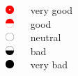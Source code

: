 \documentclass[ 10pt]{beamer}
\begin{document}
{\begin{columns}[]
\begin{column}[t]{0.4\textwidth}
{\includegraphics[height=0.13in]{CR5.pdf} $\quad$ very good\\
\vspace{1mm}
\includegraphics[height=0.13in]{CR4.pdf} $\quad$ good\\
\vspace{1mm}
\includegraphics[height=0.13in]{CR3.pdf} $\quad$ neutral\\
\vspace{1mm}
\includegraphics[height=0.13in]{CR2.pdf} $\quad$ bad\\
\vspace{1mm}
\includegraphics[height=0.13in]{CR1.pdf} $\quad$ very bad\\
\vspace{2mm}
}

\end{column}
\end{columns}
}
\end{document}
